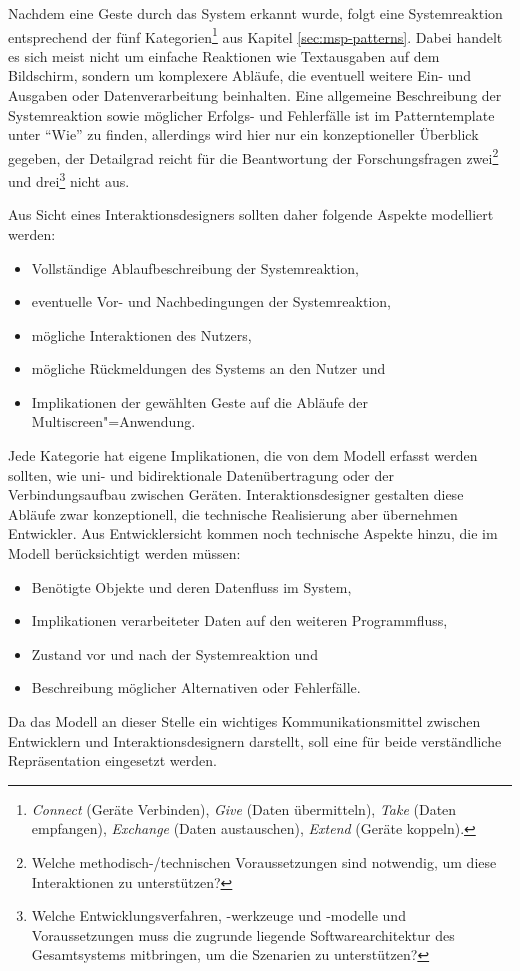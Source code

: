 Nachdem eine Geste durch das System erkannt wurde, folgt eine Systemreaktion entsprechend der fünf Kategorien\footnote{\textit{Connect} (Geräte Verbinden), \textit{Give} (Daten übermitteln), \textit{Take} (Daten empfangen), \textit{Exchange} (Daten austauschen), \textit{Extend} (Geräte koppeln).} aus Kapitel \ref{sec:msp-patterns}. Dabei handelt es sich meist nicht um einfache Reaktionen wie \zb Textausgaben auf dem Bildschirm, sondern um komplexere Abläufe, die eventuell weitere Ein- und Ausgaben oder Datenverarbeitung beinhalten. Eine allgemeine Beschreibung der Systemreaktion sowie möglicher Erfolgs- und Fehlerfälle ist im Patterntemplate unter "`Wie"' zu finden, allerdings wird hier nur ein konzeptioneller Überblick gegeben, der Detailgrad reicht für die Beantwortung der Forschungsfragen zwei\footnote{Welche methodisch-/technischen Voraussetzungen sind notwendig, um diese Interaktionen zu unterstützen?} und drei\footnote{Welche Entwicklungsverfahren, -werkzeuge und -modelle und Voraussetzungen muss die zugrunde liegende Softwarearchitektur des Gesamtsystems mitbringen, um die Szenarien zu unterstützen?} nicht aus.

Aus Sicht eines Interaktionsdesigners sollten daher folgende Aspekte modelliert werden:
\begin{itemize}
\item Vollständige Ablaufbeschreibung der Systemreaktion,
\item eventuelle Vor- und Nachbedingungen der Systemreaktion,
\item mögliche Interaktionen des Nutzers,
\item mögliche Rückmeldungen des Systems an den Nutzer und
\item Implikationen der gewählten Geste auf die Abläufe der Multiscreen"=Anwendung.
\end{itemize}
Jede Kategorie hat eigene Implikationen, die von dem Modell erfasst werden sollten, wie \zb uni- und bidirektionale Datenübertragung oder der Verbindungsaufbau zwischen Geräten. Interaktionsdesigner gestalten diese Abläufe zwar konzeptionell, die technische Realisierung aber übernehmen Entwickler. Aus Entwicklersicht kommen noch technische Aspekte hinzu, die im Modell berücksichtigt werden müssen:
\begin{itemize}
\item Benötigte Objekte und deren Datenfluss im System,
\item Implikationen verarbeiteter Daten auf den weiteren Programmfluss,
\item Zustand vor und nach der Systemreaktion und
\item Beschreibung möglicher Alternativen oder Fehlerfälle.
\end{itemize}
Da das Modell an dieser Stelle ein wichtiges Kommunikationsmittel zwischen Entwicklern und Interaktionsdesignern darstellt, soll eine für beide verständliche Repräsentation eingesetzt werden.

